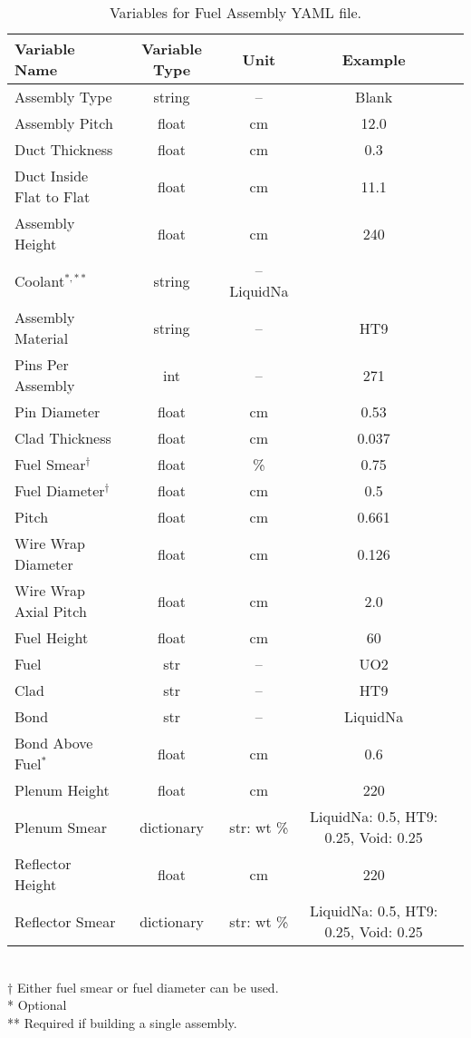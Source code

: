 \documentclass{article}
\begin{document}
\begin{table}
	\centering
	\caption{Variables for Fuel Assembly YAML file.}
	\begin{tabular}{lcccc}\toprule
		Variable Name   & Variable Type & Unit & Example 
		\\
		\hline
		Assembly Type  & string & -- & Blank
		\\
		Assembly Pitch & float  & cm & 12.0
		\\		
		Duct Thickness & float & cm & 0.3
		\\
	    Duct Inside Flat to Flat & float & cm & 11.1
		\\
		Assembly Height & float & cm & 240
		\\
		Coolant$^{*,**}$ & string & -- LiquidNa
		\\
		Assembly Material & string & -- & HT9
		\\
		Pins Per Assembly & int & -- & 271
		\\
		Pin Diameter & float & cm & 0.53
		\\
		Clad Thickness & float & cm & 0.037 
		\\
		Fuel Smear$^\dagger$ & float & \% & 0.75
		\\
		Fuel Diameter$^\dagger$ & float & cm & 0.5
		\\		
		Pitch & float & cm & 0.661
		\\		
		Wire Wrap Diameter & float & cm & 0.126
		\\
		Wire Wrap Axial Pitch & float & cm & 2.0
		\\
		Fuel Height & float & cm & 60
		\\
		Fuel & str & -- & UO2
		\\
		Clad & str & -- & HT9
		\\
		Bond & str & -- & LiquidNa
		\\
		Bond Above Fuel$^*$ & float & cm & 0.6
		\\
		Plenum Height & float & cm & 220
		\\
		Plenum Smear & dictionary & {str: wt \%} & {LiquidNa: 0.5, HT9: 0.25, Void: 0.25}
		\\
		Reflector Height & float & cm & 220
		\\
		Reflector Smear & dictionary & {str: wt \%} & {LiquidNa: 0.5, HT9: 0.25, Void: 0.25}
		\\
		\bottomrule
	\end{tabular}
	\\
	$\dagger$ Either fuel smear or fuel diameter can be used.
	\\
	* Optional
	\\
	** Required if building a single assembly.
	\\	
	\label{tab:fuel}
\end{table}
\end{document}
